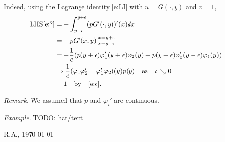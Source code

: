 \documentclass[12pt,a4paper]{article}
\begin{document}
    Indeed,
    using the Lagrange identity \eqref{e:LI}
    with $u = G(\cdot, y)$ and $v = 1$,
    \begin{align}
        \text{LHS}\eqref{e:?}
        & =
        -
        \int_{y - \epsilon}^{y + \epsilon}
        (p G'(\cdot, y))'(x) 
        dx
        \\
        & =
        \left.
        - p G'(x, y)
        \right|_{x = y - \epsilon}^{x = y + \epsilon}
        \\
        & =
        -
        \frac1c
        (
            p(y + \epsilon) \varphi_1'(y + \epsilon) \varphi_2(y)
            -
            p(y - \epsilon) \varphi_2'(y - \epsilon) \varphi_1(y)
        )
        \\
        & \to 
        \frac1c (\varphi_1 \varphi_2' - \varphi_1' \varphi_2)(y) p(y)
        \quad \text{as} \quad
        \epsilon \searrow 0
        \\
        & = 1
        \quad \text{by} \quad \eqref{e:c}
        .
    \end{align}

    \emph{Remark}.
    We assumed that $p$ and $\varphi_i'$ are continuous.
    
    
    \emph{Example}. {\color{red} TODO: hat/tent} 
    
    \vfill\hfill 
    R.A., \today
\end{document}
